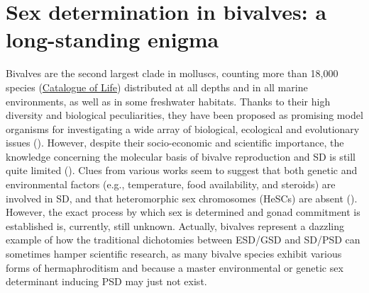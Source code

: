 \documentclass[../main.tex]{subfiles}
\begin{document}
\section{Sex determination in bivalves: a long-standing enigma}
Bivalves are the second largest clade in molluscs, counting more than 18,000 species (\href{https://www.catalogueoflife.org/}{Catalogue of Life}) distributed at all depths and in all marine environments, as well as in some freshwater habitats. Thanks to their high diversity and biological peculiarities, they have been proposed as promising model organisms for investigating a wide array of biological, ecological and evolutionary issues (\textbf{\cite{milani2020faraway,ghiselli2021bivalve}}). However, despite their socio-economic and scientific importance, the knowledge concerning the molecular basis of bivalve reproduction and SD is still quite limited (\textbf{\cite{breton2018sex}}). Clues from various works seem to suggest that both genetic and environmental factors (e.g., temperature, food availability, and steroids) are involved in SD, and that heteromorphic sex chromosomes (HeSCs) are absent (\textbf{\cite{breton2018sex,han2022ancient}}). However, the exact process by which sex is determined and gonad commitment is established is, currently, still unknown. Actually, bivalves represent a dazzling example of how the traditional dichotomies between ESD/GSD and SD/PSD can sometimes hamper scientific research, as many bivalve species exhibit various forms of hermaphroditism and because a master environmental or genetic sex determinant inducing PSD may just not exist.
\end{document}
